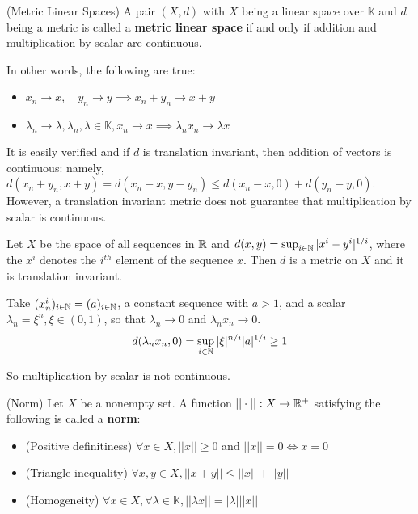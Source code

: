 \documentclass{article}
\begin{document}
\begin{defn}
    (Metric Linear Spaces) 
    A pair $(X, d)$ with $X$ being a linear space over $\mathbb{K}$ and $d$ being a metric is called a \textbf{metric linear space} if and only if
    addition and multiplication by scalar are continuous.
\end{defn}   


In other words, the following are true:  

\begin{itemize}
    \item $x_n \to x, \quad y_n \to y \implies x_n + y_n \to x + y$
    \item $\lambda_n \to \lambda, \lambda_n, \lambda \in \mathbb{K},  x_n \to x \implies \lambda_n x_n \to \lambda x$
\end{itemize}  

It is easily verified and if $d$ is translation invariant, then addition of vectors is continuous: namely,
$d(x_n+y_n, x+y)=d(x_n-x, y-y_n) \leq d(x_n-x,0)+ d(y_n-y, 0)$.  However, a translation invariant metric does not
guarantee that multiplication by scalar is continuous.  

\begin{eg}
    Let $X$ be the space of all sequences in $\mathbb{R}$ and $d(x,y) = \sup_{i\in \mathbb{N}} |x^i-y^i|^{1/i}$, where the $x^i$
    denotes the $i^{th}$ element of the sequence $x$. Then $d$ is a metric on $X$ and it is translation invariant.  
    
    Take $(x^i_n)_{i\in \mathbb{N}}=(a)_{i \in \mathbb{N}}$, a constant sequence with $a>1$, and a scalar $\lambda_n = \xi^n, \xi \in (0,1)$, so that $\lambda_n \to 0$
    and $\lambda_n x_n \to 0$.  
    \begin{equation*}
        d(\lambda_n x_n, 0) = \sup_{i\in \mathbb{N}} |\xi|^{n/i} |a|^{1/i} \geq 1
    \end{equation*}  

    So multiplication by scalar is not continuous.
\end{eg}

\begin{defn}
    (Norm) Let $X$ be a nonempty set. A function $||\cdot||: X \to \mathbb{R}^+$ satisfying the following 
    is called a \textbf{norm}:
    \begin{itemize}
        \item (Positive definitiness) $\forall x \in X, ||x|| \geq 0$ and $||x||=0 \iff x=0$
        \item (Triangle-inequality) $\forall x,y \in X, ||x+y|| \leq ||x|| + ||y||$
        \item (Homogeneity) $\forall x \in X, \forall \lambda \in \mathbb{K}, ||\lambda x|| = |\lambda| ||x||$
    \end{itemize}
\end{defn}  
\end{document}
